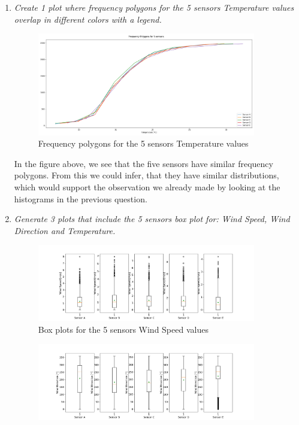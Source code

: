 \documentclass[a4paper,12pt]{article} %
\begin{document}
\begin{enumerate}
\item {\it Create 1 plot where frequency polygons for the 5 sensors Temperature values overlap in different colors with a legend.}
 \begin{figure}[H] %
    \centering %
    \includegraphics[width=0.9\textwidth]{frequency_polygon.png} 
    \caption{Frequency polygons for the 5 sensors Temperature values} %
  \end{figure}
In the figure above, we see that the five sensors have similar frequency polygons. From this we could infer, that they have similar distributions, which would support the observation we already made by looking at the histograms in the previous question. 
\newpage
\item {\it Generate 3 plots that include the 5 sensors box plot for: Wind Speed, Wind Direction and Temperature.}
\begin{figure}[H] %
    \centering %
    \includegraphics[width=0.9\textwidth]{boxplot_windspeed.png} 
    \caption{Box plots for the 5 sensors Wind Speed values} %
  \end{figure}
\begin{figure}[H] %
    \centering %
    \includegraphics[width=0.9\textwidth]{boxplot_winddirection.png} 

\end{figure}
\end{enumerate}
\end{document}
